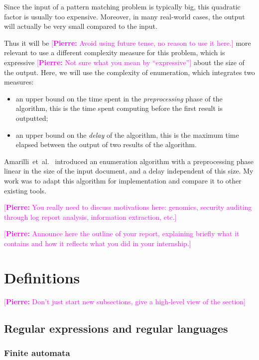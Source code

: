 \documentclass[12px]{article}
\theoremstyle{definition}
\newcommand{\pierre}[1]{\textcolor{magenta}{[\textbf{Pierre:} #1]}}
\begin{document}
    Since the input of a pattern matching problem is typically big, this
    quadratic factor is usually too expensive. Moreover, in many real-world
    cases, the output will actually be very small compared to the input.

    Thus it will be \pierre{Avoid using future tense, no reason to use it
    here.} more relevant to use a different complexity measure for
    this problem, which is expressive \pierre{Not sure what you mean by
    ``expressive''} about the size of the output. Here, we
    will use the complexity of enumeration, which integrates two measures:
    \begin{itemize}
      \item an upper bound on the time spent in the \textit{preprocessing}
        phase of the algorithm, this is the time spent computing before the
        first result is outputted;
      \item an upper bound on the \textit{delay} of the algorithm, this is
        the maximum time elapsed between the output of two results of the
        algorithm.
    \end{itemize}

    Amarilli~et~al.~\cite{ICDT19} introduced an enumeration algorithm with a
    preprocessing phase linear in the size of the input document, and a delay
    independent of this size. My work was to adapt this algorithm for
    implementation and compare it to other existing tools.

    \pierre{You really need to discuss motivations here: genomics,
    security auditing through log report analysis, information
    extraction, etc.}    

    \pierre{Announce here the outline of your report, explaining briefly
    what it contains and how it reflects what you did in your
    internship.}


  \section{Definitions}

  \pierre{Don't just start new subsections, give a high-level view of the
  section}

    \subsection{Regular expressions and regular languages}

      \subsubsection{Finite automata}
\end{document}
